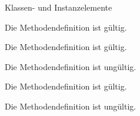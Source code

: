 \begin{exercise}{Klassen- und Instanzelemente}
\begin{solution}
\begin{parts}
\item
Die Methodendefinition ist gültig.

\item
Die Methodendefinition ist gültig.

\item
Die Methodendefinition ist ungültig.

\item
Die Methodendefinition ist gültig.

\item
Die Methodendefinition ist ungültig.
\end{parts}
\end{solution}
\end{exercise}
